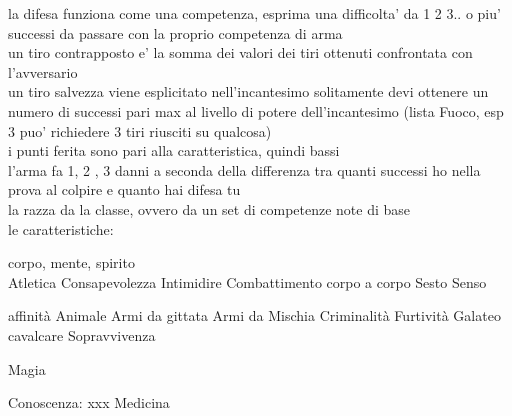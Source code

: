 \documentclass[12pt,a4paper]{book}
\begin{document}
la difesa funziona come una competenza, esprima una difficolta' da 1 2 3.. o piu' successi da passare con la proprio competenza di arma\\

un tiro contrapposto e' la somma dei valori dei tiri ottenuti confrontata con l'avversario\\

un tiro salvezza viene esplicitato nell'incantesimo solitamente devi ottenere un numero di successi pari max al livello di potere dell'incantesimo (lista Fuoco, esp 3 puo' richiedere 3 tiri riusciti su qualcosa)\\

i punti ferita sono pari alla caratteristica, quindi bassi\\

l'arma fa 1, 2 , 3 danni a seconda della differenza tra quanti successi ho nella prova al colpire e quanto hai difesa tu\\

la razza da la classe, ovvero da un set di competenze note di base\\

le caratteristiche:

corpo, mente, spirito\\


Atletica
Consapevolezza
Intimidire
Combattimento corpo a corpo
Sesto Senso

affinità Animale
Armi da gittata
Armi da Mischia
Criminalità
Furtività
Galateo
cavalcare
Sopravvivenza

Magia

Conoscenza: xxx
Medicina



	
\end{document}
